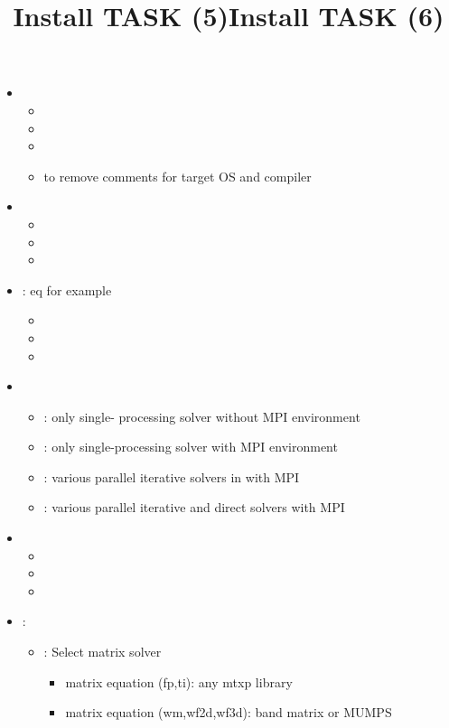 \documentclass[12pt]{article}
\begin{document}
\title{Install TASK (5)}
\begin{itemize}
\item
{}
\begin{itemize}
\item
{}
\item
{}
\item
{}
\item
{} to remove comments for target OS and compiler
\end{itemize}
\item
{}
\begin{itemize}
\item
{}
\item
{}
\item
{}
\end{itemize}
\item
{}: eq for example
\begin{itemize}
\item
{}
\item
{}
\item
{}
\end{itemize}
\end{itemize}

\title{Install TASK (6)}
\begin{itemize}
\item
{}
\begin{itemize}
\item
{}: only single- processing solver without MPI environment
\item
{}: only single-processing solver with MPI environment
\item
{}: various parallel iterative solvers in  with MPI
\item
{}: various parallel iterative and direct solvers with MPI
\end{itemize}
\item
{}
\begin{itemize}
\item
{}
\item
{}
\item
{}
\end{itemize}
\item
{}:
\begin{itemize}
\item
{}: Select matrix solver
\begin{itemize}
\item
{} matrix equation (fp,ti): any mtxp library
\item
{} matrix equation (wm,wf2d,wf3d): band matrix or MUMPS
\end{itemize}
\end{itemize}
\end{itemize}
\end{document}
